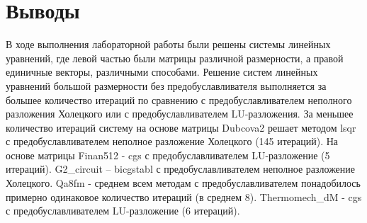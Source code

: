 \section*{Выводы}

В ходе выполнения лабораторной работы были решены системы линейных уравнений,
где левой частью были матрицы различной размерности, а правой единичные векторы,
различными способами.
Решение систем линейных уравнений большой размерности без предобуславливателя выполняется
за большее количество итераций по сравнению с предобуславливателем неполного разложения
Холецкого или с предобуславливателем LU-разложения.
За меньшее количество итераций систему на основе матрицы Dubcova2 решает
методом lsqr с предобуславливателем неполное разложение Холецкого (145 итераций).
На основе матрицы Finan512 - cgs с предобуславливателем LU-разложение (5 итераций).
G2_circuit – bicgstabl с предобуславливателем неполное разложение Холецкого.
Qa8fm - среднем всем методам с предобуславливателем понадобилось
примерно одинаковое количество итераций (в среднем 8).
Thermomech\_dM - cgs с предобуславливателем LU-разложение (6 итераций).